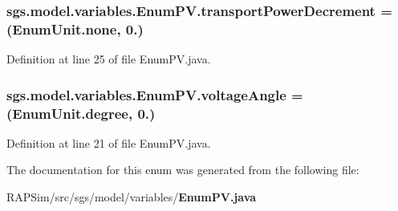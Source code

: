 \subsubsection[{transport\-Power\-Decrement}]{\setlength{\rightskip}{0pt plus 5cm}sgs.\-model.\-variables.\-Enum\-P\-V.\-transport\-Power\-Decrement =({\bf Enum\-Unit.\-none}, 0.)}\label{enumsgs_1_1model_1_1variables_1_1_enum_p_v_a8fbc35b51ea37605a3a1e3f243691f24}


Definition at line 25 of file Enum\-P\-V.\-java.

\subsubsection[{voltage\-Angle}]{\setlength{\rightskip}{0pt plus 5cm}sgs.\-model.\-variables.\-Enum\-P\-V.\-voltage\-Angle =({\bf Enum\-Unit.\-degree}, 0.)}\label{enumsgs_1_1model_1_1variables_1_1_enum_p_v_a0a787b25e732e3c3d4c865122b34c800}


Definition at line 21 of file Enum\-P\-V.\-java.



The documentation for this enum was generated from the following file\-:\begin{DoxyCompactItemize}
\item 
R\-A\-P\-Sim/src/sgs/model/variables/{\bf Enum\-P\-V.\-java}\end{DoxyCompactItemize}

